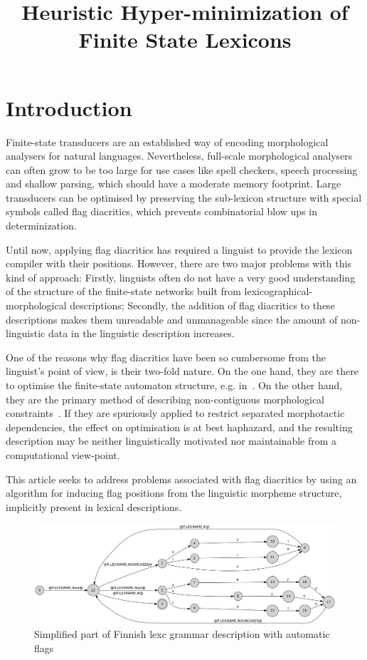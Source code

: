 \documentclass[10pt, a4paper]{article}
\title{Heuristic Hyper-minimization of Finite State Lexicons}
\begin{document}
\maketitleabstract


\section{Introduction}

Finite-state transducers are an established way of encoding
morphological analysers for natural languages. Nevertheless,
full-scale morphological analysers can often grow to be too large for
use cases like spell checkers, speech processing and shallow parsing, which 
should have a moderate memory footprint. Large transducers can be optimised by preserving the sub-lexicon structure with special symbols called flag diacritics, which prevents combinatorial blow ups in determinization.


Until now, applying flag diacritics has required a linguist to provide
the lexicon compiler with their positions. However, there are two
major problems with this kind of approach: Firstly, linguists often do
not have a very good understanding of the structure of the
finite-state networks built from lexicographical-morphological
descriptions; Secondly, the addition of flag diacritics to these
descriptions makes them unreadable and unmanageable since the amount
of non-linguistic data in the linguistic description increases. 

One of the reasons why flag diacritics have been so cumbersome from
the linguist's point of view, is their two-fold nature. On the one hand,
they are there to optimise the finite-state automaton structure,
e.g. in~\cite{karttunen2006numbers}. On the other hand, they are the
primary method of describing non-contiguous morphological
constraints~\cite{beesley1998constraining}. If they are spuriously applied to restrict 
separated morphotactic dependencies, the effect on
optimisation is at best haphazard, and the resulting description may be
neither linguistically motivated nor maintainable from a computational
view-point.

This article seeks to address problems associated with flag diacritics
by using an algorithm for inducing flag positions from the linguistic
morpheme structure, implicitly present in lexical
descriptions.

\begin{figure}
    \includegraphics[width=\textwidth]{transducer.png}
     \caption{Simplified part of Finnish lexc grammar description with automatic flags
     \label{fig:lexc-fin-flag}}
\end{figure}
\end{document}
